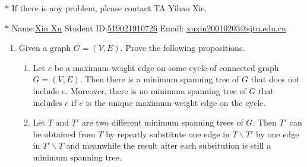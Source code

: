 \documentclass[12pt,a4paper]{article}
\theoremstyle{definition}
\begin{document}
\noindent

\noindent{}
\begin{center}
\footnotesize{\color{red}$*$ If there is any problem, please contact TA Yihao Xie. }

\footnotesize{\color{blue}$*$ Name:\underline{Xin Xu}  \quad Student ID:\underline{519021910726} \quad Email: \underline{xuxin20010203@sjtu.edu.cn}}
\end{center}

\begin{enumerate}

	\item Given a graph $G = (V, E)$. Prove the following propositions.
	
	\begin{enumerate}
		\item Let $e$ be a maximum-weight edge on some cycle of connected graph $G=(V,E)$.
        Then there is a minimum spanning tree of $G$ that does not include $e$. Moreover, there is no minimum spanning tree of $G$ that includes $e$ if $e$ is the unique maximum-weight edge on the cycle. 
		\item Let $T$ and $T'$ are two different minimum spanning trees of $G$. Then $T'$ can be obtained from $T$ by repeatly substitute one edge in $T\backslash T'$ by one edge in $T'\backslash T$ and meanwhile the result after each subsitution is still a minimum spanning tree.
	\end{enumerate}


\end{enumerate}
\end{document}
